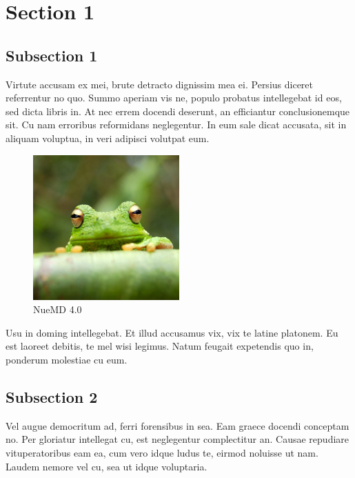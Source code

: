 \section{Section 1}
\label{sec:examples}

\subsection{Subsection 1}

Virtute accusam ex mei, brute detracto dignissim mea ei. Persius diceret referrentur no quo. Summo aperiam vis ne, populo probatus intellegebat id eos, sed dicta libris in. At nec errem docendi deserunt, an efficiantur conclusionemque sit. Cu nam erroribus reformidans neglegentur. In eum sale dicat accusata, sit in aliquam voluptua, in veri adipisci volutpat eum.

\begin{figure}[!hbt]
\centering
\includegraphics[width=0.5\textwidth]{img/frog.jpg}
\caption{\label{fig:frog}NueMD 4.0}
\end{figure}

Usu in doming intellegebat. Et illud accusamus vix, vix te latine platonem. Eu est laoreet debitis, te mel wisi legimus. Natum feugait expetendis quo in, ponderum molestiae cu eum.

\subsection{Subsection 2}

Vel augue democritum ad, ferri forensibus in sea. Eam graece docendi conceptam no. Per gloriatur intellegat cu, est neglegentur complectitur an. Causae repudiare vituperatoribus eam ea, cum vero idque ludus te, eirmod noluisse ut nam. Laudem nemore vel cu, sea ut idque voluptaria.

